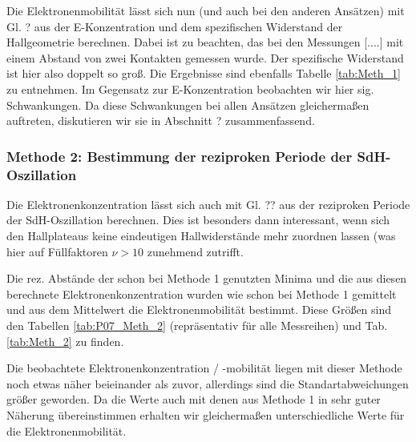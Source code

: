 Die Elektronenmobilität lässt sich nun (und auch bei den anderen Ansätzen) mit Gl. ? aus der E-Konzentration und dem spezifischen Widerstand der Hallgeometrie berechnen. Dabei ist zu beachten, das bei den Messungen [....] mit einem Abstand von zwei Kontakten gemessen wurde. Der spezifische Widerstand ist hier also doppelt so groß. Die Ergebnisse sind ebenfalls Tabelle \ref{tab:Meth_1} zu entnehmen. Im Gegensatz zur E-Konzentration beobachten wir hier sig. Schwankungen. Da diese Schwankungen bei allen Ansätzen gleichermaßen auftreten, diskutieren wir sie in Abschnitt ? zusammenfassend.

\begin{table}
	\centering
	\caption{}
	
	\label{tab:P07_Meth_1}
\end{table}
\begin{table}
	\centering
	\caption{}
	
	\label{tab:Meth_1}
\end{table}

\newpage
\subsubsection{Methode 2: Bestimmung der reziproken Periode der SdH-Oszillation} \label{subsubsec:Meth_2}
Die Elektronenkonzentration lässt sich auch mit Gl. ?? aus der reziproken Periode der SdH-Oszillation berechnen. Dies ist besonders dann interessant, wenn sich den Hallplateaus keine eindeutigen Hallwiderstände mehr zuordnen lassen (was hier auf Füllfaktoren $\nu > 10$ zunehmend zutrifft.

Die rez. Abstände der schon bei Methode 1 genutzten Minima und die aus diesen berechnete Elektronenkonzentration wurden wie schon bei Methode 1 gemittelt und aus dem Mittelwert die Elektronenmobilität bestimmt. Diese Größen sind den Tabellen \ref{tab:P07_Meth_2} (repräsentativ für alle Messreihen) und Tab. \ref{tab:Meth_2} zu finden. 

Die beobachtete Elektronenkonzentration / -mobilität liegen mit dieser Methode noch etwas näher beieinander als zuvor, allerdings sind die Standartabweichungen größer geworden. Da die Werte auch mit denen aus Methode 1 in sehr guter Näherung übereinstimmen erhalten wir gleichermaßen unterschiedliche Werte für die Elektronenmobilität.
 
\begin{figure}[htbp]
	\centering
	
	\caption{}
	\label{abb:P07_Meth_2}
\end{figure}

